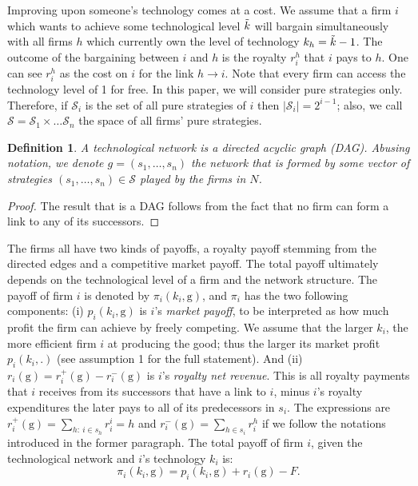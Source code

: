 \documentclass{article}
\newtheorem{definition}{Definition}
\begin{document}
\indent Improving upon someone's technology comes at a cost. We assume that a firm $i$ which wants to achieve some technological level $\Tilde{k}$ will bargain simultaneously with all firms $h$ which currently own the level of technology $k_h=\Tilde{k}-1$. The outcome of the bargaining between $i$ and $h$ is the royalty $r^{h}_i$ that $i$ pays to $h$. One can see $r^{h}_i$ as the cost on $i$ for the link $h\rightarrow i$. Note that every firm can access the technology level of 1 for free. In this paper, we will consider pure strategies only. Therefore, if $\mathcal{S}_i$ is the set of all pure strategies of $i$ then $|\mathcal{S}_i|=2^{i-1}$; also, we call $\mathcal{S}=\mathcal{S}_1\times\ldots \mathcal{S}_n$ the space of all firms' pure strategies.  \\

\begin{definition}
A technological network  is a directed acyclic graph (DAG). Abusing notation, we denote $g=(s_1,\dots, s_n)$ the network that is formed by some vector of strategies $(s_1,\ldots, s_n)\in \mathcal{S}$ played by the firms in $N$. 
\end{definition}
\begin{proof}
The result that  is a DAG follows from the fact that no firm can form a link to any of its successors. 
\end{proof}



\indent The firms all have two kinds of payoffs, a royalty payoff stemming from the directed edges and a competitive market payoff. The total payoff ultimately depends on the technological level of a firm and the network structure. The payoff of firm $i$ is denoted by $\pi_i(k_i,\text{g})$, and $\pi_i$ has the two following components: (i) $p_i(k_i,\text{g})$ is $i$'s \textit{market payoff}, to be interpreted as how much profit the firm can achieve by freely competing. We assume that the larger $k_i$, the more efficient firm $i$ at producing the good; thus the larger its market profit $p_i(k_i,.)$ (see assumption 1 for the full statement). And (ii) $r_i(\text{g})=r_i^+(\text{g})-r_i^-(\text{g})$ is $i$'s \textit{royalty net revenue}. This is all royalty payments that $i$ receives from its successors that have a link to $i$, minus $i$'s royalty expenditures the later pays to all of its predecessors in $s_i$. The expressions are $r^+_i(\text{g})=\sum_{h:~ i\in s_h}r^i_i=h$ and $r^-_i(\text{g})=\sum_{h\in s_i} r^{h}_i$ if we follow the notations introduced in the former paragraph. The total payoff of firm $i$, given the technological network  and $i$'s technology $k_i$ is: 
\begin{equation}
    \pi_i(k_i,\text{g})=p_i(k_i,\text{g})+r_i(\text{g}) -F. 
\end{equation}
\end{document}
